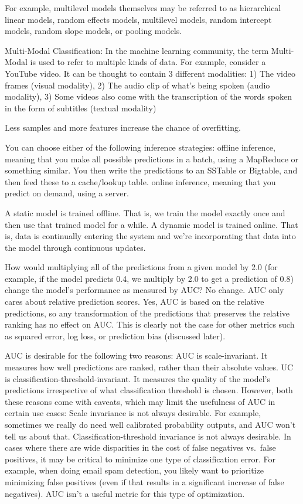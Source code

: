 \documentclass[]{book}
\begin{document}
For example, multilevel models themselves may be referred to as hierarchical linear models, random effects models, multilevel models, random intercept models, random slope models, or pooling models.

Multi-Modal Classification: In the machine learning community, the term Multi-Modal is used to refer to multiple kinds of data. For example, consider a YouTube video. It can be thought to contain 3 different modalities: 1) The video frames (visual modality), 2) The audio clip of what's being spoken (audio modality), 3) Some videos also come with the transcription of the words spoken in the form of subtitles (textual modality)

Less samples and more features increase the chance of overfitting.

You can choose either of the following inference strategies: offline inference, meaning that you make all possible predictions in a batch, using a MapReduce or something similar. You then write the predictions to an SSTable or Bigtable, and then feed these to a cache/lookup table. online inference, meaning that you predict on demand, using a server.

A static model is trained offline. That is, we train the model exactly once and then use that trained model for a while. A dynamic model is trained online. That is, data is continually entering the system and we're incorporating that data into the model through continuous updates.

How would multiplying all of the predictions from a given model by 2.0 (for example, if the model predicts 0.4, we multiply by 2.0 to get a prediction of 0.8) change the model's performance as measured by AUC? No change. AUC only cares about relative prediction scores. Yes, AUC is based on the relative predictions, so any transformation of the predictions that preserves the relative ranking has no effect on AUC. This is clearly not the case for other metrics such as squared error, log loss, or prediction bias (discussed later).

AUC is desirable for the following two reasons: AUC is scale-invariant. It measures how well predictions are ranked, rather than their absolute values. UC is classification-threshold-invariant. It measures the quality of the model's predictions irrespective of what classification threshold is chosen. However, both these reasons come with caveats, which may limit the usefulness of AUC in certain use cases: Scale invariance is not always desirable. For example, sometimes we really do need well calibrated probability outputs, and AUC won't tell us about that. Classification-threshold invariance is not always desirable. In cases where there are wide disparities in the cost of false negatives vs.~false positives, it may be critical to minimize one type of classification error. For example, when doing email spam detection, you likely want to prioritize minimizing false positives (even if that results in a significant increase of false negatives). AUC isn't a useful metric for this type of optimization.
\end{document}
